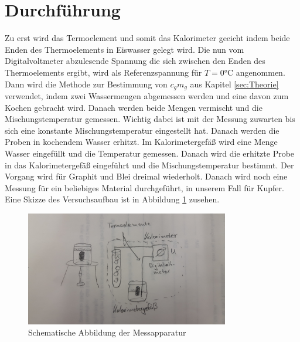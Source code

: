 \section{Durchführung}
\label{sec:Durchführung}
Zu erst wird das Termoelement und somit das Kalorimeter geeicht indem
beide Enden des Thermoelements in Eiswasser gelegt wird. Die nun vom Digitalvoltmeter
abzulesende Spannung die sich zwischen den Enden des Thermoelements ergibt, wird
als Referenzspannung für $T = 0 \si{\celsius}$ angenommen.
Dann wird die Methode zur Bestimmung von $c_gm_g$ aus Kapitel \ref{sec:Theorie}
verwendet, indem zwei Wassermengen abgemessen werden und eine davon zum Kochen
gebracht wird. Danach werden beide Mengen vermischt und die Mischungstemperatur
gemessen. Wichtig dabei ist mit der Messung zuwarten bis sich eine konstante
Mischungstemperatur eingestellt hat. Danach werden die Proben in kochendem
Wasser erhitzt. Im Kalorimetergefäß wird eine Menge Wasser eingefüllt und die
Temperatur gemessen. Danach wird die erhitzte Probe in das Kalorimetergefäß
eingeführt und die Mischungstemperatur bestimmt.
Der Vorgang wird für Graphit und Blei dreimal wiederholt.  Danach wird noch eine
Messung für ein beliebiges Material durchgeführt, in unserem Fall für Kupfer.
Eine Skizze des Versuchsaufbau ist in Abbildung \ref{fig:skizze} zusehen.

\begin{figure}
  \centering
  \includegraphics[height=5cm]{logos/skizze.jpg}
  \caption{Schematische Abbildung der Messapparatur}
  \label{fig:skizze}
\end{figure}
